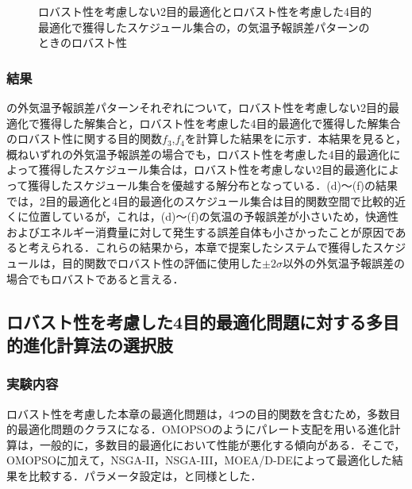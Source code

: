 \begin{figure}[htbp]
\begin{center}
        \vspace{-1mm}
        \caption{ロバスト性を考慮しない2目的最適化とロバスト性を考慮した4目的最適化で獲得したスケジュール集合の，の気温予報誤差パターンのときのロバスト性}
        \label{fig::robust_result_pareto_10}
    \end{center}
\end{figure}

\subsubsection{結果}
の外気温予報誤差パターンそれぞれについて，ロバスト性を考慮しない2目的最適化で獲得した解集合と，ロバスト性を考慮した4目的最適化で獲得した解集合のロバスト性に関する目的関数$f_3$,$f_4$を計算した結果をに示す．本結果を見ると，概ねいずれの外気温予報誤差の場合でも，ロバスト性を考慮した4目的最適化によって獲得したスケジュール集合は，ロバスト性を考慮しない2目的最適化によって獲得したスケジュール集合を優越する解分布となっている．(d)～(f)の結果では，2目的最適化と4目的最適化のスケジュール集合は目的関数空間で比較的近くに位置しているが，これは，(d)～(f)の気温の予報誤差が小さいため，快適性およびエネルギー消費量に対して発生する誤差自体も小さかったことが原因であると考えられる．これらの結果から，本章で提案したシステムで獲得したスケジュールは，目的関数でロバスト性の評価に使用した$\pm2\sigma$以外の外気温予報誤差の場合でもロバストであると言える．


\subsection{ロバスト性を考慮した4目的最適化問題に対する多目的進化計算法の選択肢}
\subsubsection{実験内容}
ロバスト性を考慮した本章の最適化問題は，4つの目的関数を含むため，多数目的最適化問題のクラスになる．OMOPSOのようにパレート支配を用いる進化計算は，一般的に，多数目的最適化において性能が悪化する傾向がある．そこで，OMOPSOに加えて，NSGA-II，NSGA-III，MOEA/D-DEによって最適化した結果を比較する．パラメータ設定は，と同様とした．


